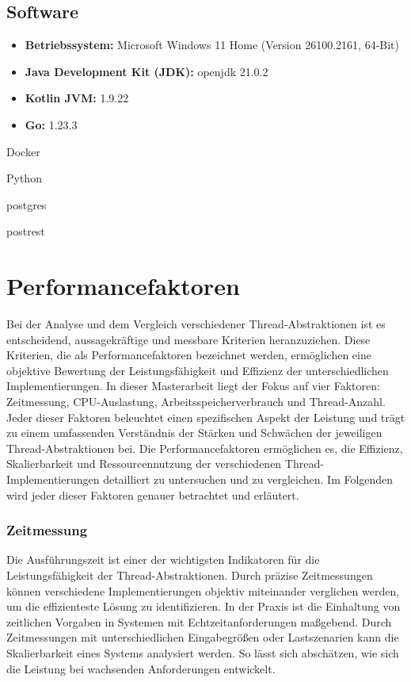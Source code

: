 \documentclass[fontsize=12pt,paper=a4,twoside=semi,parskip=half-,headsepline,headinclude]{scrreprt}
\begin{document}
\subsection{Software}

\begin{itemize}
	\item \textbf{Betriebssystem:} Microsoft Windows 11 Home (Version 26100.2161, 64-Bit)
	\item \textbf{Java Development Kit (JDK):} openjdk 21.0.2
	\item \textbf{Kotlin JVM:} 1.9.22
	\item \textbf{Go:} 1.23.3
\end{itemize}

Docker

Python

postgres

postrest


\section{Performancefaktoren}

Bei der Analyse und dem Vergleich verschiedener Thread-Abstraktionen ist es entscheidend, aussagekräftige und messbare Kriterien heranzuziehen. Diese Kriterien, die als Performancefaktoren bezeichnet werden, ermöglichen eine objektive Bewertung der Leistungsfähigkeit und Effizienz der unterschiedlichen Implementierungen. In dieser Masterarbeit liegt der Fokus auf vier Faktoren: Zeitmessung, CPU-Auslastung, Arbeitsspeicherverbrauch und Thread-Anzahl. Jeder dieser Faktoren beleuchtet einen spezifischen Aspekt der Leistung und trägt zu einem umfassenden Verständnis der Stärken und Schwächen der jeweiligen Thread-Abstraktionen bei. Die Performancefaktoren ermöglichen es, die Effizienz, Skalierbarkeit und Ressourcennutzung der verschiedenen Thread-\-Imple\-mentie\-rungen detailliert zu untersuchen und zu vergleichen. Im Folgenden wird jeder dieser Faktoren genauer betrachtet und erläutert.

\subsubsection{Zeitmessung}

Die Ausführungszeit ist einer der wichtigsten Indikatoren für die Leistungsfähigkeit der Thread-Abstraktionen. Durch präzise Zeitmessungen können verschiedene Implementierungen objektiv miteinander verglichen werden, um die effizienteste Lösung zu identifizieren. In der Praxis ist die Einhaltung von zeitlichen Vorgaben in Systemen mit Echtzeitanforderungen maßgebend. Durch Zeitmessungen mit unterschiedlichen Eingabegrößen oder Lastszenarien kann die Skalierbarkeit eines Systems analysiert werden. So lässt sich abschätzen, wie sich die Leistung bei wachsenden Anforderungen entwickelt.
\end{document}
